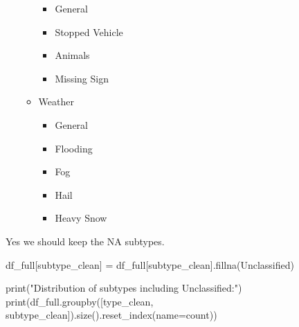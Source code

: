 \documentclass[
  letterpaper,
  DIV=11,
  numbers=noendperiod]{scrartcl}
\newenvironment{Shaded}{\begin{snugshade}}{\end{snugshade}}
\newcommand{\BuiltInTok}[1]{\textcolor[rgb]{0.00,0.23,0.31}{#1}}
\newcommand{\NormalTok}[1]{\textcolor[rgb]{0.00,0.23,0.31}{#1}}
\newcommand{\OperatorTok}[1]{\textcolor[rgb]{0.37,0.37,0.37}{#1}}
\newcommand{\StringTok}[1]{\textcolor[rgb]{0.13,0.47,0.30}{#1}}
\providecommand{\tightlist}{%
  \setlength{\itemsep}{0pt}\setlength{\parskip}{0pt}}\usepackage{longtable,booktabs,array}
\begin{document}
\begin{itemize}
\begin{itemize}
    \begin{itemize}
    \tightlist
    \item
      General
    \item
      Stopped Vehicle
    \item
      Animals
    \item
      Missing Sign
    \end{itemize}
  \item
    Weather

    \begin{itemize}
    \tightlist
    \item
      General
    \item
      Flooding
    \item
      Fog
    \item
      Hail
    \item
      Heavy Snow
    \end{itemize}
  \end{itemize}
\end{itemize}

Yes we should keep the NA subtypes.

\begin{Shaded}
\begin{Highlighting}[]
\NormalTok{df\_full[}\StringTok{\textquotesingle{}subtype\_clean\textquotesingle{}}\NormalTok{] }\OperatorTok{=}\NormalTok{ df\_full[}\StringTok{\textquotesingle{}subtype\_clean\textquotesingle{}}\NormalTok{].fillna(}\StringTok{\textquotesingle{}Unclassified\textquotesingle{}}\NormalTok{)}

\BuiltInTok{print}\NormalTok{(}\StringTok{"Distribution of subtypes including Unclassified:"}\NormalTok{)}
\BuiltInTok{print}\NormalTok{(df\_full.groupby([}\StringTok{\textquotesingle{}type\_clean\textquotesingle{}}\NormalTok{, }\StringTok{\textquotesingle{}subtype\_clean\textquotesingle{}}\NormalTok{]).size().reset\_index(name}\OperatorTok{=}\StringTok{\textquotesingle{}count\textquotesingle{}}\NormalTok{))}
\end{Highlighting}
\end{Shaded}
\end{document}
